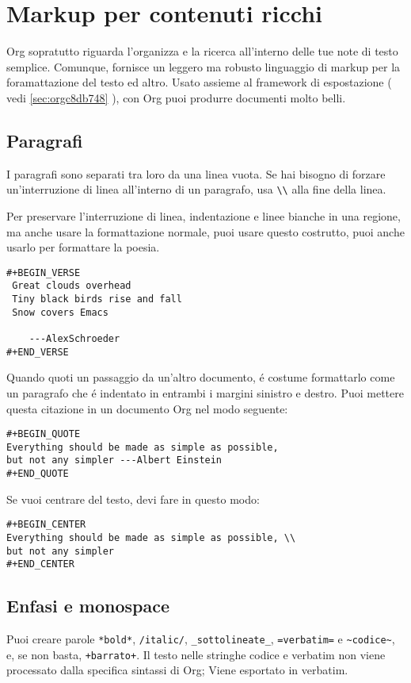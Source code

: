 \documentclass[11pt]{article}
\begin{document}
\section[Markup]{Markup per contenuti ricchi}
\label{sec:org3563413}
Org sopratutto riguarda l'organizza e la ricerca all'interno delle tue
note di testo semplice. Comunque, fornisce un leggero ma robusto
linguaggio di markup per la foramattazione del testo ed altro. Usato
assieme al framework di espostazione ( vedi \ref{sec:orgc8db748} ), con Org
puoi produrre documenti molto belli.

\subsection{Paragrafi}
\label{sec:orgb9f47e4}
I paragrafi sono separati tra loro da una linea vuota. Se hai bisogno
di forzare un'interruzione di linea all'interno di un paragrafo, usa
\texttt{\textbackslash{}\textbackslash{}} alla fine della linea.

Per preservare l'interruzione di linea, indentazione e linee bianche
in una regione, ma anche usare la formattazione normale, puoi usare
questo costrutto, puoi anche usarlo per formattare la poesia.

\begin{verbatim}
#+BEGIN_VERSE
 Great clouds overhead
 Tiny black birds rise and fall
 Snow covers Emacs

    ---AlexSchroeder
#+END_VERSE
\end{verbatim}

Quando quoti un passaggio da un'altro documento, é costume formattarlo
come un paragrafo che é indentato in entrambi i margini sinistro e
destro. Puoi mettere questa citazione in un documento Org nel modo
seguente:

\begin{verbatim}
#+BEGIN_QUOTE
Everything should be made as simple as possible,
but not any simpler ---Albert Einstein
#+END_QUOTE
\end{verbatim}

Se vuoi centrare del testo, devi fare in questo modo:

\begin{verbatim}
#+BEGIN_CENTER
Everything should be made as simple as possible, \\
but not any simpler
#+END_CENTER
\end{verbatim}

\subsection{Enfasi e monospace}
\label{sec:org29c1023}
Puoi creare parole \texttt{*bold*}, \texttt{/italic/}, \texttt{\_sottolineate\_},
\texttt{=verbatim=} e \texttt{\textasciitilde{}codice\textasciitilde{}}, e, se non basta, \texttt{+barrato+}. Il testo
nelle stringhe codice e verbatim non viene processato dalla specifica
sintassi di Org; Viene esportato in verbatim.
\end{document}
